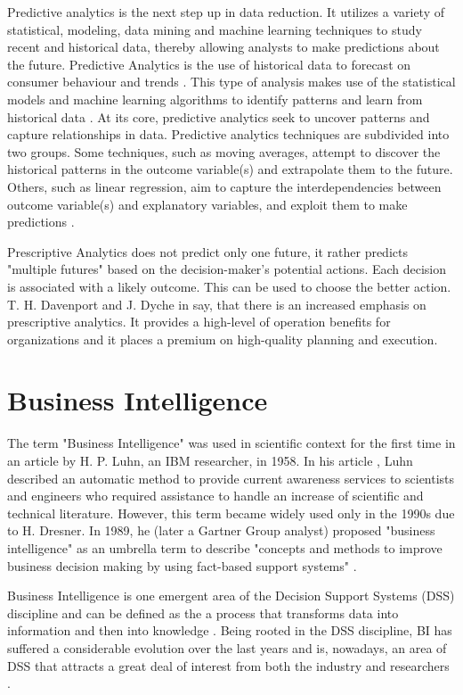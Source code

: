 \documentclass[runningheads]{llncs}
\begin{document}
Predictive analytics is the next step up in data reduction. It utilizes a variety of statistical, modeling, data mining and machine learning techniques to study recent and historical data, thereby allowing analysts to make predictions about the future\cite{CHARTER}. Predictive Analytics is the use of historical data to forecast on consumer behaviour and trends \cite{TALLIN}. This type of analysis makes use of the statistical models and machine learning algorithms to identify patterns and learn from historical data \cite{MIS}. At its core, predictive analytics seek to uncover patterns and capture relationships in data. Predictive analytics techniques are subdivided into two groups. Some techniques, such as moving averages, attempt to discover the historical patterns in the outcome variable(s) and extrapolate them to the future. Others, such as linear regression, aim to capture the interdependencies between outcome variable(s) and explanatory variables, and exploit them to make predictions \cite{ELS}.

Prescriptive Analytics does not predict only one future, it rather predicts "multiple futures" based on the decision-maker’s potential actions. Each decision is associated with a likely outcome. This can be used to choose the better action. T. H. Davenport and J. Dyche in \cite{DAVENPORT} say, that there is an increased emphasis on prescriptive analytics. It provides a high-level of operation benefits for organizations and it places a premium on high-quality planning and execution. 

\section{Business Intelligence}

The term "Business Intelligence" was used in scientific context for the first time in an article by H. P. Luhn, an IBM researcher, in 1958. In his article \cite{LUHN}, Luhn described an automatic method to provide current awareness services to scientists and engineers who required assistance to handle an increase of scientific and technical literature. However, this term became widely used only in the 1990s due to H. Dresner. In 1989, he (later a Gartner Group analyst) proposed "business intelligence" as an umbrella term to describe "concepts and methods to improve business decision making by using fact-based support systems" \cite{POWER}. 

Business Intelligence is one emergent area of the Decision Support Systems (DSS) discipline and can be defined as the a process that transforms data into information and then into knowledge \cite{GOLFARELLI}. Being rooted in the DSS discipline, BI has suffered a considerable evolution over the last years and is, nowadays, an area of DSS that attracts a great deal of interest from both the industry and researchers \cite{SHOLLO}.
\end{document}
